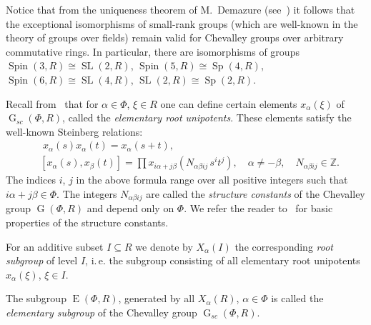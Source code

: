 \documentclass[oneside, 12pt]{amsart}
\theoremstyle{plain}
\numberwithin{equation}{section}
\numberwithin{lemma}{section}
\theoremstyle{definition}
\theoremstyle{remark}
\DeclareMathOperator{\G}{G}
\DeclareMathOperator{\SL}{SL}
\DeclareMathOperator{\Sp}{Sp}
\DeclareMathOperator{\E}{E}
\DeclareMathOperator{\Spin}{Spin}
\begin{document}
Notice that from the uniqueness theorem of M.~Demazure (see~\cite[Corollaire~5.2]{SGA3}) 
it follows that the exceptional isomorphisms of small-rank groups (which are well-known in the theory of groups over fields) remain valid for Chevalley groups over arbitrary commutative rings.
In particular, there are isomorphisms of groups $\Spin(3, R)\cong\SL(2, R)$, $\Spin(5, R)\cong \Sp(4, R)$, $\Spin(6, R)\cong\SL(4, R)$, $\SL(2, R)\cong \Sp(2, R)$.  

Recall from~\cite{St78, VP} that for $\alpha\in \Phi$, $\xi\in R$ one can define certain elements $x_{\alpha}(\xi)$ of $\G_{sc}(\Phi, R)$, called the {\it elementary root unipotents}.
These elements satisfy the well-known Steinberg relations:
\begin{align}
& \phantom{[}
x_\alpha(s) x_\alpha(t) = x_\alpha(s+t), \label{rel:add}\\
& [x_\alpha(s), x_\beta(t)] = \prod x_{i\alpha + j\beta}\left(N_{\alpha\beta ij}\, s^i t^j\right), \quad \alpha\neq-\beta, \quad N_{\alpha\beta ij}\in\mathbb{Z}. \label{rel:CCF}
\end{align} 
The indices $i$, $j$ in the above formula range over all positive integers such that $i\alpha + j\beta\in\Phi$.
The integers $N_{\alpha\beta ij}$ are called the \emph{structure constants} of the Chevalley group $\G(\Phi, R)$ and depend only on $\Phi$.
We refer the reader to~\cite[\S14]{VP} for basic properties of the structure constants.

For an additive subset $I\subseteq R$ we denote by $X_\alpha(I)$ the corresponding \emph{root subgroup} of level $I$, i.\,e. the subgroup consisting of all elementary root unipotents $x_\alpha(\xi)$, $\xi\in I$.

The subgroup $\E(\Phi, R)$, generated by all $X_\alpha(R)$, $\alpha\in\Phi$ is called the {\it elementary subgroup} of the Chevalley group $\G_{sc}(\Phi, R)$.
\end{document}
